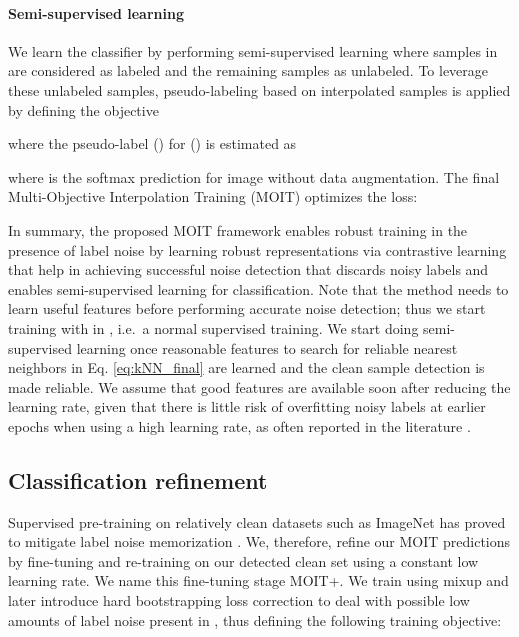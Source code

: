 \documentclass[final]{cvpr}
\begin{document}
\paragraph*{Semi-supervised learning}

We learn the classifier by performing semi-supervised learning where samples in  are considered as labeled and the remaining samples as unlabeled. To leverage these unlabeled samples, pseudo-labeling \cite{2020_IJCNN_Pseudo} based on interpolated samples is applied by defining the objective

where the pseudo-label  () for
 () is estimated as

where  is the softmax prediction for image  without data augmentation. The final Multi-Objective Interpolation Training (MOIT)  optimizes the loss:

In summary, the proposed MOIT framework enables robust training in the presence of label noise by learning robust representations via contrastive learning that help in achieving successful noise detection that discards noisy labels and enables semi-supervised learning for classification. Note that the method needs to learn useful features before performing accurate noise detection; thus we start training with  in , i.e.~a normal supervised training. We start doing semi-supervised learning once reasonable features to search for reliable nearest neighbors in Eq. \ref{eq:kNN_final} are learned and the clean sample detection is made reliable. We assume that good features are available soon after reducing the learning rate, given that there is little risk of overfitting noisy labels at earlier epochs when using a high learning rate, as often reported in the literature
\cite{2018_CVPR_JointOpt,2019_CVPR_JointOptimizImproved,2019_ICML_DynamicBootstrapping}.

\subsection{Classification refinement\label{subsec:Classification-refinement}}

Supervised pre-training on relatively clean datasets such as ImageNet \cite{2009_CVPR_ImageNet} has proved to mitigate label noise memorization \cite{2019_ICML_PreTraining,2020_ICML_DatasetOOD}. We, therefore, refine our MOIT predictions by fine-tuning  and re-training  on our detected clean set  using a constant low learning rate. We name this fine-tuning stage MOIT+. We train using mixup \cite{2018_ICLR_mixup} and later introduce  hard bootstrapping loss correction \cite{2015_ICLR_Bootstrapping} to deal with possible low amounts of label noise present in , thus defining the following training objective: 
\end{document}
